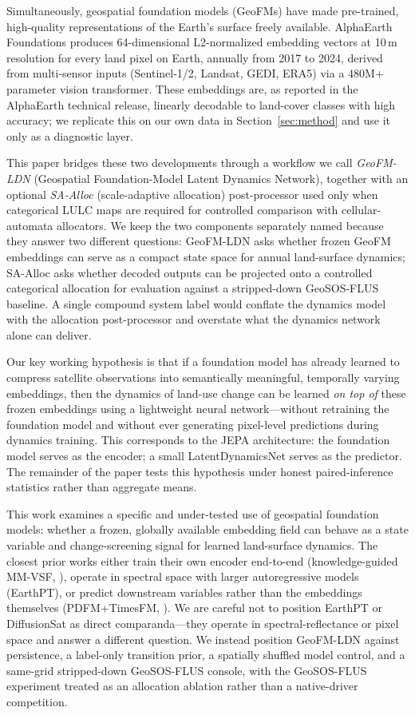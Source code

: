 \documentclass{article}
\begin{document}
Simultaneously, geospatial foundation models (GeoFMs) have made pre-trained, high-quality representations of the Earth's surface freely available. AlphaEarth Foundations \citep{brown2025alphaearth} produces 64-dimensional L2-normalized embedding vectors at 10\,m resolution for every land pixel on Earth, annually from 2017 to 2024, derived from multi-sensor inputs (Sentinel-1/2, Landsat, GEDI, ERA5) via a 480M+ parameter vision transformer. These embeddings are, as reported in the AlphaEarth technical release, linearly decodable to land-cover classes with high accuracy; we replicate this on our own data in Section~\ref{sec:method} and use it only as a diagnostic layer.

This paper bridges these two developments through a workflow we call \textit{GeoFM-LDN} (Geospatial Foundation-Model Latent Dynamics Network), together with an optional \textit{SA-Alloc} (scale-adaptive allocation) post-processor used only when categorical LULC maps are required for controlled comparison with cellular-automata allocators. We keep the two components separately named because they answer two different questions: GeoFM-LDN asks whether frozen GeoFM embeddings can serve as a compact state space for annual land-surface dynamics; SA-Alloc asks whether decoded outputs can be projected onto a controlled categorical allocation for evaluation against a stripped-down GeoSOS-FLUS baseline. A single compound system label would conflate the dynamics model with the allocation post-processor and overstate what the dynamics network alone can deliver.

Our key working hypothesis is that if a foundation model has already learned to compress satellite observations into semantically meaningful, temporally varying embeddings, then the dynamics of land-use change can be learned \textit{on top of} these frozen embeddings using a lightweight neural network---without retraining the foundation model and without ever generating pixel-level predictions during dynamics training. This corresponds to the JEPA architecture: the foundation model serves as the encoder; a small LatentDynamicsNet serves as the predictor. The remainder of the paper tests this hypothesis under honest paired-inference statistics rather than aggregate means.

This work examines a specific and under-tested use of geospatial foundation models: whether a frozen, globally available embedding field can behave as a state variable and change-screening signal for learned land-surface dynamics. The closest prior works either train their own encoder end-to-end (knowledge-guided MM-VSF, \citealt{mmvsf2024}), operate in spectral space with larger autoregressive models (EarthPT), or predict downstream variables rather than the embeddings themselves (PDFM+TimesFM, \citealt{google2024pdfm}). We are careful not to position EarthPT or DiffusionSat as direct comparanda---they operate in spectral-reflectance or pixel space and answer a different question. We instead position GeoFM-LDN against persistence, a label-only transition prior, a spatially shuffled model control, and a same-grid stripped-down GeoSOS-FLUS console, with the GeoSOS-FLUS experiment treated as an allocation ablation rather than a native-driver competition.
\end{document}
